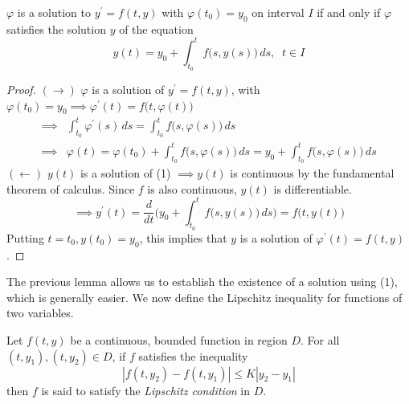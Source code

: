 \documentclass{article}
\newcounter{theorem}[section]
\newcounter{definition}[section]
\begin{document}
    \begin{lemma}
      \label{thm:equivalence-of-the-ivp-and-the-integral-equation}
    $\varphi$ is a solution to $y^\prime = f(t, y)$ with $\varphi(t_0) = y_0$ on interval $I$ if and only if $\varphi$ satisfies the solution $y$ of the equation
    \begin{equation}
        y(t) = y_0 + \int_{t_0}^t f\big( s, y(s)\big) \,ds, \;\; t \in I
    \end{equation}
    \end{lemma}
    \begin{proof}
    $(\rightarrow)$ $\varphi$ is a solution of $y^\prime = f(t, y)$, with $\varphi(t_0) = y_0 \implies \varphi^\prime (t) = f \big(t, \varphi(t) \big)$
    \begin{align*}
        \implies & \int_{t_0}^t \varphi^\prime (s) \,ds = \int_{t_0}^t f \big( s, \varphi(s) \big) \, ds \\
        \implies & \varphi(t) = \varphi(t_0) + \int_{t_0}^t f\big(s, \varphi(s)\big) \,ds = y_0 + \int_{t_0}^t f \big( s, \varphi(s) \big) \,ds
    \end{align*}
    $(\leftarrow)$ $y(t)$ is a solution of (1) $\implies y(t)$ is continuous by the fundamental theorem of calculus. Since $f$ is also continuous, $y(t)$ is differentiable. 
    \begin{equation}
      \implies y^\prime (t) = \frac{d}{dt} \bigg( y_0 + \int_{t_0}^t f\big( s, y(s) \big) \, ds \bigg) = f\big(t, y(t) \big)
    \end{equation}
    Putting $t=t_0, y (t_0) = y_0$, this implies that $y$ is a solution of $\varphi^\prime (t) = f(t, y)$. 
    \end{proof}

    The previous lemma allows us to establish the existence of a solution using (1), which is generally easier. We now define the Lipschitz inequality for functions of two variables. 

    \begin{definition}
      \label{def:lipschitz-condition}
    Let $f(t, y)$ be a continuous, bounded function in region $D$. For all $(t, y_1), (t, y_2) \in D$, if $f$ satisfies the inequality 
    \begin{equation}
      |f(t, y_2) - f(t, y_1)| \leq K |y_2 - y_1|
    \end{equation}
    then $f$ is said to satisfy the \textit{Lipschitz condition} in $D$.
    \end{definition}
\end{document}
